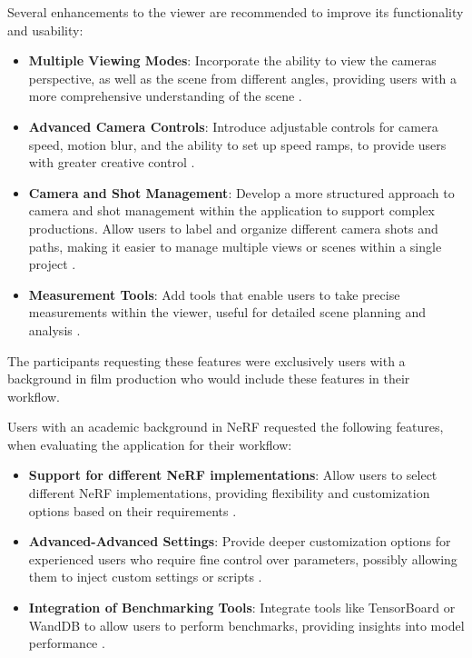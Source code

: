 Several enhancements to the viewer are recommended to improve its functionality and usability:

\begin{itemize}
  \item \textbf{Multiple Viewing Modes}: Incorporate the ability to view the cameras perspective, as well as the scene from different angles, providing users with a more comprehensive understanding of the scene \cite{P5}. 
  \item \textbf{Advanced Camera Controls}: Introduce adjustable controls for camera speed, motion blur, and the ability to set up speed ramps, to provide users with greater creative control \cite{P5}. 
  \item \textbf{Camera and Shot Management}: Develop a more structured approach to camera and shot management within the application to support complex productions.
  Allow users to label and organize different camera shots and paths, making it easier to manage multiple views or scenes within a single project \cite{P5}.
  \item \textbf{Measurement Tools}: Add tools that enable users to take precise measurements within the viewer, useful for detailed scene planning and analysis \cite{P7}. 
\end{itemize}

The participants requesting these features were exclusively users with a background in film production who would include these features in their workflow.

Users with an academic background in NeRF requested the following features, when evaluating the application for their workflow:

\begin{itemize}
  \item \textbf{Support for different NeRF implementations}: Allow users to select different NeRF implementations, providing flexibility and customization options based on their requirements \cite{P1}. 
  \item \textbf{Advanced-Advanced Settings}: Provide deeper customization options for experienced users who require fine control over parameters, possibly allowing them to inject custom settings or scripts \cite{P9}.
  \item \textbf{Integration of Benchmarking Tools}: Integrate tools like TensorBoard or WandDB to allow users to perform benchmarks, providing insights into model performance \cite{P10}.
\end{itemize}



